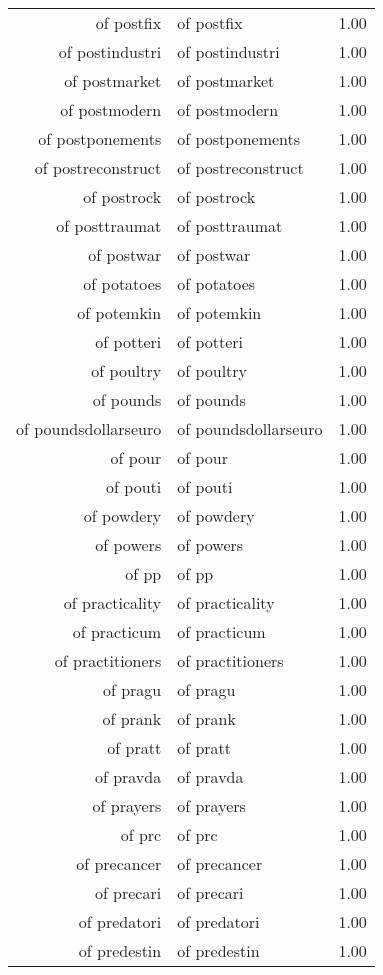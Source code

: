 \begin{table}[ht]
\begin{tabular}{rlr}
  of postfix & of postfix & 1.00 \\ 
  of postindustri & of postindustri & 1.00 \\ 
  of postmarket & of postmarket & 1.00 \\ 
  of postmodern & of postmodern & 1.00 \\ 
  of postponements & of postponements & 1.00 \\ 
  of postreconstruct & of postreconstruct & 1.00 \\ 
  of postrock & of postrock & 1.00 \\ 
  of posttraumat & of posttraumat & 1.00 \\ 
  of postwar & of postwar & 1.00 \\ 
  of potatoes & of potatoes & 1.00 \\ 
  of potemkin & of potemkin & 1.00 \\ 
  of potteri & of potteri & 1.00 \\ 
  of poultry & of poultry & 1.00 \\ 
  of pounds & of pounds & 1.00 \\ 
  of poundsdollarseuro & of poundsdollarseuro & 1.00 \\ 
  of pour & of pour & 1.00 \\ 
  of pouti & of pouti & 1.00 \\ 
  of powdery & of powdery & 1.00 \\ 
  of powers & of powers & 1.00 \\ 
  of pp & of pp & 1.00 \\ 
  of practicality & of practicality & 1.00 \\ 
  of practicum & of practicum & 1.00 \\ 
  of practitioners & of practitioners & 1.00 \\ 
  of pragu & of pragu & 1.00 \\ 
  of prank & of prank & 1.00 \\ 
  of pratt & of pratt & 1.00 \\ 
  of pravda & of pravda & 1.00 \\ 
  of prayers & of prayers & 1.00 \\ 
  of prc & of prc & 1.00 \\ 
  of precancer & of precancer & 1.00 \\ 
  of precari & of precari & 1.00 \\ 
  of predatori & of predatori & 1.00 \\ 
  of predestin & of predestin & 1.00 \\ 

\end{tabular}
\end{table}
